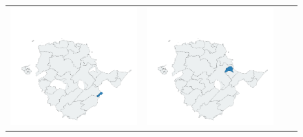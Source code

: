 \begin{figure}
\begin{tabularx}{1\textwidth}{XXXX}
\includegraphics[width=1\linewidth]{images/ch6/loading/17}&
\includegraphics[width=1\linewidth]{images/ch6/loading/18}&

\end{tabularx}
\end{figure}
